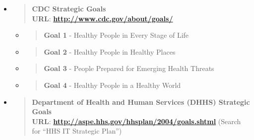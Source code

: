 \begin{itemize}
\item
  \begin{quote}
  \textbf{CDC Strategic Goals}\\
  \textbf{URL}:
  \href{http://www.cdc.gov/about/goals/}{\textbf{http://www.cdc.gov/about/goals/}}
  \end{quote}

  \begin{itemize}
  \item
    \begin{quote}
    \textbf{Goal 1} - Healthy People in Every Stage of Life
    \end{quote}
  \item
    \begin{quote}
    \textbf{Goal 2} - Healthy People in Healthy Places
    \end{quote}
  \item
    \begin{quote}
    \textbf{Goal 3} - People Prepared for Emerging Health Threats
    \end{quote}
  \item
    \begin{quote}
    \textbf{Goal 4} - Healthy People in a Healthy World
    \end{quote}
  \end{itemize}
\item
  \begin{quote}
  \textbf{Department of Health and Human Services (DHHS) Strategic
  Goals}\\
  \textbf{URL}:
  \href{http://aspe.hhs.gov/hhsplan/2004/goals.shtml}{\textbf{http://aspe.hhs.gov/hhsplan/2004/goals.shtml}}
  (Search for ``HHS IT Strategic Plan'')
  \end{quote}


\end{itemize}
